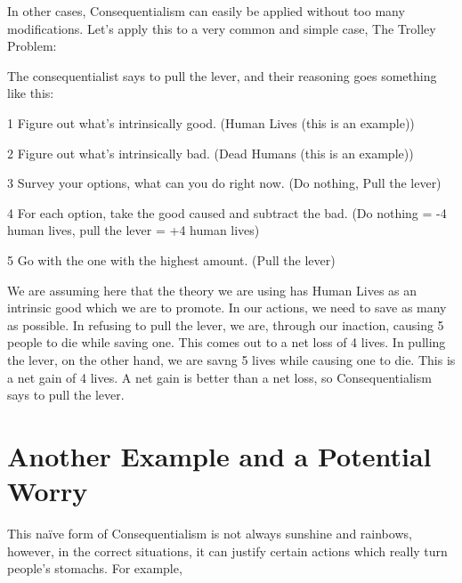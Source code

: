 In other cases, Consequentialism can easily be applied without too many modifications. Let's apply this to a very common and simple case, The Trolley Problem:


The consequentialist says to pull the lever, and their reasoning goes something like this:
\begin{earg}
    \item[1] Figure out what’s intrinsically good. (Human Lives (this is an example))
    \item[2] Figure out what’s intrinsically bad. (Dead Humans (this is an example))
    \item[3] Survey your options, what can you do right now. (Do nothing, Pull the lever)
    \item[4] For each option, take the good caused and subtract the bad. (Do nothing = -4 human lives, pull the lever = +4 human lives)
    \item[5] Go with the one with the highest amount. (Pull the lever)
\end{earg}

We are assuming here that the theory we are using has Human Lives as an intrinsic good which we are to promote. In our actions, we need to save as many as possible. In refusing to pull the lever, we are, through our inaction, causing 5 people to die while saving one. This comes out to a net loss of 4 lives. In pulling the lever, on the other hand, we are savng 5 lives while causing one to die. This is a net gain of 4 lives. A net gain is better than a net loss, so Consequentialism says to pull the lever. 

\section{Another Example and a Potential Worry} 
This na\"ive form of Consequentialism is not always sunshine and rainbows, however, in the correct situations, it can justify certain actions which really turn people's stomachs. For example,


